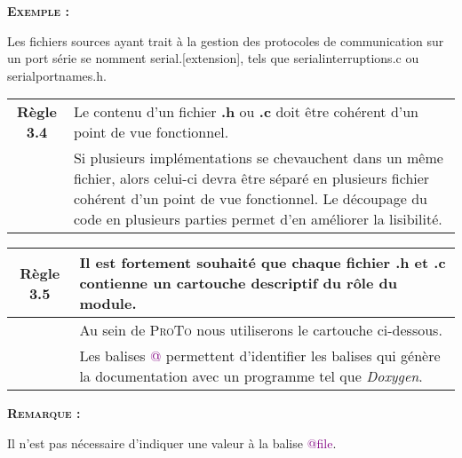 \smallskip
\begin{large}
\textbf{\textsc{Exemple :}}
\end{large}
Les fichiers sources ayant trait à la gestion des protocoles de communication sur un port série se nomment {\selectfont serial.[extension]}, tels que {\selectfont serial\textunderscore interruptions.c} ou {\selectfont serial\textunderscore port\textunderscore names.h}.

\medskip

\begin{center}
\begin{tabular}{|c p{12.3cm}|}
\hline
\rowcolor{red!10}\textbf{Règle 3.4} & Le contenu d'un fichier \textbf{.h} ou \textbf{.c} doit être cohérent d'un point de vue fonctionnel.\\
 & Si plusieurs implémentations se chevauchent dans un même fichier, alors celui-ci devra être séparé en plusieurs fichier cohérent d'un point de vue fonctionnel. Le découpage du code en plusieurs parties permet d'en améliorer la lisibilité. \\ \hline
\hline
\end{tabular}
\end{center}

\medskip

\begin{center}
\begin{tabular}{|c p{12.3cm}|}
\hline
\rowcolor{red!10}\textbf{Règle 3.5} & Il est fortement souhaité que chaque fichier \textbf{.h} et \textbf{.c} contienne un cartouche descriptif du rôle du module. \\ \hline
 & Au sein de \textsc{ProTo} nous utiliserons le cartouche ci-dessous. \\
 & Les balises \textcolor{purple}{@} permettent d'identifier les balises qui génère la documentation avec un programme tel que \textit{Doxygen}. \\ \hline
\hline
\end{tabular}
\end{center}

\smallskip


\smallskip
\begin{large}
\textbf{\textsc{Remarque :}}
\end{large}
Il n'est pas nécessaire d'indiquer une valeur à la balise \textcolor{purple}{@file}.

